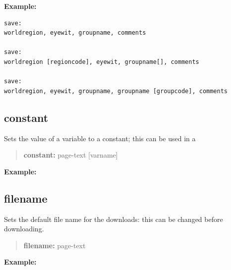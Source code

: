 \documentclass[letterpaper,10pt,english]{sphinxmanual}
\begin{document}
\textbf{Example:}

\begin{Verbatim}[commandchars=\\\{\}]
save:
worldregion, eyewit, groupname, comments

save:
worldregion [regioncode], eyewit, groupname[], comments

save:
worldregion, eyewit, groupname, groupname [groupcode], comments
\end{Verbatim}


\subsection{constant}
\label{forms:constant}
Sets the value of a variable to a constant; this can be used in a
\begin{quote}

\begin{DUlineblock}{0em}
\item[] \textbf{constant:} page-text {[}varname{]}
\end{DUlineblock}
\end{quote}

\textbf{Example:}
\begin{quote}

\end{quote}


\subsection{filename}
\label{forms:filename}
Sets the default file name for the downloads: this can be changed before
downloading.
\begin{quote}

\begin{DUlineblock}{0em}
\item[] \textbf{filename:} page-text
\end{DUlineblock}
\end{quote}

\textbf{Example:}
\begin{quote}

\end{quote}
\end{document}

